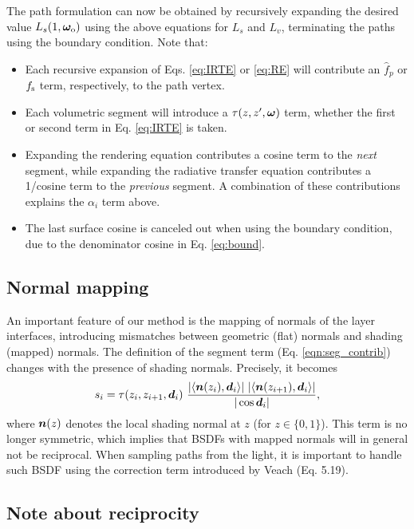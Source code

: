 The path formulation can now be obtained by recursively expanding the desired value $L_s(1, \bm\omega_\mathrm{o})$ using the above equations for $L_s$ and $L_v$, terminating the paths using the boundary condition. Note that:
\begin{itemize}
	\item Each recursive expansion of Eqs. \eqref{eq:IRTE} or \eqref{eq:RE} will contribute an $\hat f_p$ or $f_\mathrm{s}$ term, respectively, to the path vertex.
	\item Each volumetric segment will introduce a $\tau(z, z', \bm\omega)$ term, whether the first or second term in Eq. \eqref{eq:IRTE} is taken.
	\item{Expanding the rendering equation contributes a cosine term to the \emph{next} segment, while expanding the radiative transfer equation contributes a 1/cosine term to the \emph{previous} segment. A combination of these contributions explains the $\alpha_i$ term above.}
	\item The last surface cosine is canceled out when using the boundary condition, due to the denominator cosine in Eq. \eqref{eq:bound}.
\end{itemize}


\subsection{Normal mapping}

An important feature of our method is the mapping of normals of the layer interfaces, introducing mismatches between geometric (flat) normals and shading (mapped) normals. The definition of the segment term (Eq. \eqref{eqn:seg_contrib}) changes with the presence of shading normals. Precisely, it becomes
\begin{equation}
	s_i = \tau(z_i, z_{i+1}, \bmd_i) \ \frac{|\EV{\bmn(z_i),\bmd_i}| \ |\EV{\bmn(z_{i + 1}),\bmd_i}|}{|\cos \bmd_i|},
\end{equation}
where $\bm{n}(z)$ denotes the local shading normal at $z$ (for $z \in \{0, 1\}$). This term is no longer symmetric, which implies that BSDFs with mapped normals will in general not be reciprocal. When sampling paths from the light, it is important to handle such BSDF using the correction term introduced by Veach \cite{veach1997robust} (Eq. 5.19).


\subsection{Note about reciprocity}

